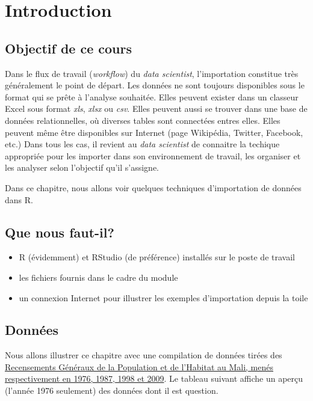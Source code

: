 \documentclass[]{book}
\begin{document}
\section{Introduction}\label{introduction-3}

\subsection{Objectif de ce cours}\label{objectif-de-ce-cours}

Dans le flux de travail (\emph{workflow}) du \emph{data scientist},
l'importation constitue très généralement le point de départ. Les
données ne sont toujours disponibles sous le format qui se prête à
l'analyse souhaitée. Elles peuvent exister dans un classeur Excel sous
format \emph{xls}, \emph{xlsx} ou \emph{csv}. Elles peuvent aussi se
trouver dans une base de données relationnelles, où diverses tables sont
connectées entres elles. Elles peuvent même être disponibles sur
Internet (page Wikipédia, Twitter, Facebook, etc.) Dans tous les cas, il
revient au \emph{data scientist} de connaitre la techique appropriée
pour les importer dans son environnement de travail, les organiser et
les analyser selon l'objectif qu'il s'assigne.

Dans ce chapitre, nous allons voir quelques techniques d'importation de
données dans R.

\subsection{Que nous faut-il?}\label{que-nous-faut-il}

\begin{itemize}
\item
  R (évidemment) et RStudio (de préférence) installés sur le poste de
  travail
\item
  les fichiers fournis dans le cadre du module
\item
  un connexion Internet pour illustrer les exemples d'importation depuis
  la toile
\end{itemize}

\subsection{Données}\label{donnees-1}

Nous allons illustrer ce chapitre avec une compilation de données tirées
des \href{https://www.malikunnafoni.com}{Recensements Généraux de la
Population et de l'Habitat au Mali, menés respectivement en 1976, 1987,
1998 et 2009}. Le tableau suivant affiche un aperçu (l'année 1976
seulement) des données dont il est question.
\end{document}
